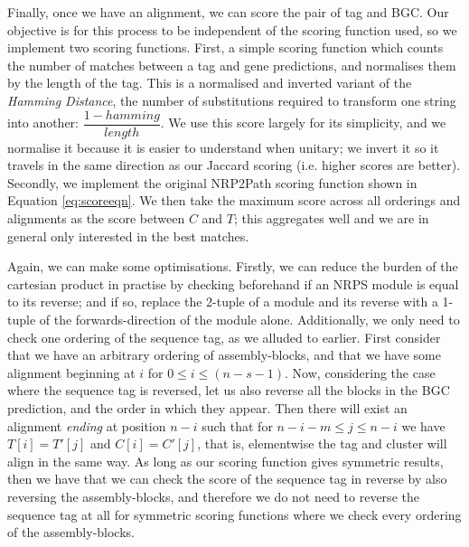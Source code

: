 \documentclass{l4proj}
\newcommand{\cit}[1]{\citep{#1}}
\begin{document}
Finally, once we have an alignment, we can score the pair of tag and BGC. Our objective is for this process to be independent of the scoring function used, so we implement two scoring functions. First, a simple scoring function which counts the number of matches between a tag and gene predictions, and normalises them by the length of the tag. This is a normalised and inverted variant of the \textit{Hamming Distance}, \cit{hamming} the number of substitutions required to transform one string into another: \(\dfrac{1 - hamming}{length}\). We use this score largely for its simplicity, and we normalise it because it is easier to understand when unitary; we invert it so it travels in the same direction as our Jaccard scoring (i.e. higher scores are better). Secondly, we implement the original NRP2Path scoring function shown in Equation \ref{eq:scoreeqn}. We then take the maximum score across all orderings and alignments as the score between \(C\) and \(T\); this aggregates well and we are in general only interested in the best matches.

Again, we can make some optimisations. Firstly, we can reduce the burden of the cartesian product in practise by checking beforehand if an NRPS module is equal to its reverse; and if so, replace the 2-tuple of a module and its reverse with a 1-tuple of the forwards-direction of the module alone. Additionally, we only need to check one ordering of the sequence tag, as we alluded to earlier. First consider that we have an arbitrary ordering of assembly-blocks, and that we have some alignment beginning at \(i\) for \(0 \leq i \leq (n-s-1)\). Now, considering the case where the sequence tag is reversed, let us also reverse all the blocks in the BGC prediction, and the order in which they appear. Then there will exist an alignment \textit{ending} at position \(n-i\) such that for \(n-i-m \leq j \leq n-i\) we have \(T[i] = T'[j]\) and \(C[i] = C'[j]\), that is, elementwise the tag and cluster will align in the same way. As long as our scoring function gives symmetric results, then we have that we can check the score of the sequence tag in reverse by also reversing the assembly-blocks, and therefore we do not need to reverse the sequence tag at all for symmetric scoring functions where we check every ordering of the assembly-blocks.
\end{document}
